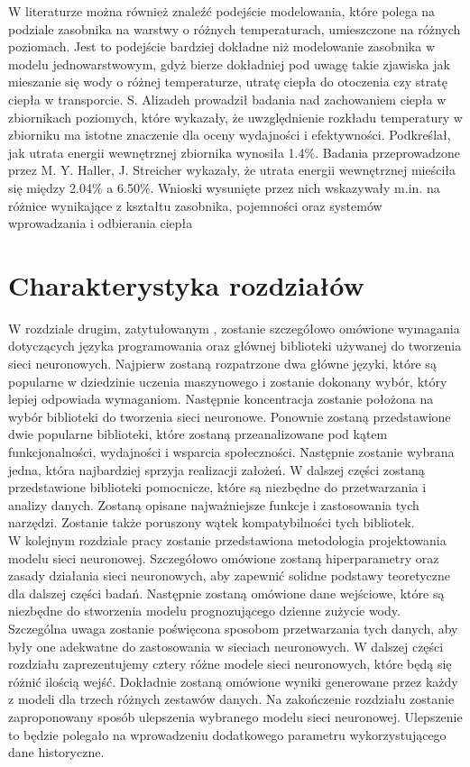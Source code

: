\documentclass[a4paper,twoside,12pt]{book}
\begin{document}
W literaturze można również znaleźć podejście modelowania, które polega na podziale zasobnika na warstwy o różnych temperaturach, umieszczone na różnych poziomach. Jest to podejście bardziej dokładne niż modelowanie zasobnika w modelu jednowarstwowym, gdyż bierze dokładniej pod uwagę takie zjawiska jak mieszanie się wody o różnej temperaturze, utratę ciepła do otoczenia czy stratę ciepła w transporcie. S. Alizadeh\cite{bib:model_2} prowadził badania nad zachowaniem ciepła w zbiornikach poziomych, które wykazały, że uwzględnienie rozkładu temperatury w zbiorniku ma istotne znaczenie dla oceny wydajności i efektywności. Podkreślał, jak utrata energii wewnętrznej zbiornika wynosiła 1.4\%. Badania przeprowadzone przez M. Y. Haller, J. Streicher\cite{bib:model_1} wykazały, że utrata energii wewnętrznej mieściła się między 2.04\% a 6.50\%. Wnioski wysunięte przez nich wskazywały m.in. na różnice wynikające z kształtu zasobnika, pojemności oraz systemów wprowadzania i odbierania ciepła

\section{Charakterystyka rozdziałów}


W rozdziale drugim, zatytułowanym , zostanie szczegółowo omówione wymagania dotyczących języka programowania oraz głównej biblioteki używanej do tworzenia sieci neuronowych. Najpierw zostaną rozpatrzone dwa główne języki, które są popularne w dziedzinie uczenia maszynowego i zostanie dokonany wybór, który lepiej odpowiada wymaganiom. Następnie koncentracja zostanie położona na wybór biblioteki do tworzenia sieci neuronowe. Ponownie zostaną przedstawione dwie popularne biblioteki, które zostaną przeanalizowane pod kątem funkcjonalności, wydajności i wsparcia społeczności. Następnie zostanie wybrana jedna, która najbardziej sprzyja realizacji założeń. W dalszej części zostaną przedstawione biblioteki pomocnicze, które są niezbędne do przetwarzania i analizy danych. Zostaną opisane najważniejsze funkcje i zastosowania tych narzędzi. Zostanie także poruszony wątek kompatybilności tych bibliotek.\\

W kolejnym rozdziale pracy zostanie przedstawiona metodologia projektowania modelu sieci neuronowej. Szczegółowo omówione zostaną hiperparametry oraz zasady działania sieci neuronowych, aby zapewnić solidne podstawy teoretyczne dla dalszej części badań. Następnie zostaną omówione dane wejściowe, które są niezbędne do stworzenia modelu prognozującego dzienne zużycie wody. Szczególna uwaga zostanie poświęcona sposobom przetwarzania tych danych, aby były one adekwatne do zastosowania w sieciach neuronowych. W dalszej części rozdziału zaprezentujemy cztery różne modele sieci neuronowych, które będą się różnić ilością wejść. Dokładnie zostaną omówione wyniki generowane przez każdy z modeli dla trzech różnych zestawów danych. Na zakończenie rozdziału zostanie zaproponowany sposób ulepszenia wybranego modelu sieci neuronowej. Ulepszenie to będzie polegało na wprowadzeniu dodatkowego parametru wykorzystującego dane historyczne.\\
\end{document}
